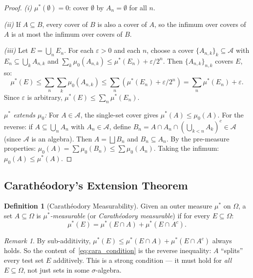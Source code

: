 \documentclass[11pt,a4paper]{article}
\theoremstyle{definition}
\newtheorem{definition}{Definition}[section]
\theoremstyle{plain}
\theoremstyle{remark}
\newtheorem{remark}{Remark}[section]
\begin{document}
\begin{proof}
\textit{(i)} $\mu^*(\emptyset) = 0$: cover $\emptyset$ by $A_n = \emptyset$ for all $n$.

\textit{(ii)} If $A \subseteq B$, every cover of $B$ is also a cover of $A$, so the infimum over covers of $A$ is at most the infimum over covers of $B$.

\textit{(iii)} Let $E = \bigcup_n E_n$. For each $\varepsilon > 0$ and each $n$, choose
a cover $\{A_{n,k}\}_{k} \subseteq \mathcal{A}$ with $E_n \subseteq \bigcup_k A_{n,k}$
and $\sum_k \mu_0(A_{n,k}) \leq \mu^*(E_n) + \varepsilon/2^n$. Then
$\{A_{n,k}\}_{n,k}$ covers $E$, so:
\begin{equation}
    \mu^*(E) \leq \sum_n \sum_k \mu_0(A_{n,k}) \leq \sum_n (\mu^*(E_n) + \varepsilon/2^n) = \sum_n \mu^*(E_n) + \varepsilon.
\end{equation}
Since $\varepsilon$ is arbitrary, $\mu^*(E) \leq \sum_n \mu^*(E_n)$.

\textit{$\mu^*$ extends $\mu_0$:} For $A \in \mathcal{A}$, the single-set cover gives
$\mu^*(A) \leq \mu_0(A)$. For the reverse: if $A \subseteq \bigcup_n A_n$ with
$A_n \in \mathcal{A}$, define $B_n = A \cap A_n \cap (\bigcup_{k<n} A_k)^c \in \mathcal{A}$
(since $\mathcal{A}$ is an algebra). Then $A = \bigsqcup B_n$ and $B_n \subseteq A_n$.
By the pre-measure properties: $\mu_0(A) = \sum \mu_0(B_n) \leq \sum \mu_0(A_n)$.
Taking the infimum: $\mu_0(A) \leq \mu^*(A)$.
\end{proof}

\subsection{Carath\'{e}odory's Extension Theorem}
\label{subsec:caratheodory}

\begin{definition}[Carath\'{e}odory Measurability]
\label{def:cara_measurable}
Given an outer measure $\mu^*$ on $\Omega$, a set $A \subseteq \Omega$ is
\emph{$\mu^*$-measurable} (or \emph{Carath\'{e}odory measurable}) if for every
$E \subseteq \Omega$:
\begin{equation}
    \mu^*(E) = \mu^*(E \cap A) + \mu^*(E \cap A^c).
    \label{eq:cara_condition}
\end{equation}
\end{definition}

\begin{remark}
By sub-additivity, $\mu^*(E) \leq \mu^*(E \cap A) + \mu^*(E \cap A^c)$ always holds.
So the content of~\eqref{eq:cara_condition} is the reverse inequality: $A$ ``splits''
every test set $E$ additively. This is a strong condition --- it must hold for
\emph{all} $E \subseteq \Omega$, not just sets in some $\sigma$-algebra.
\end{remark}
\end{document}
